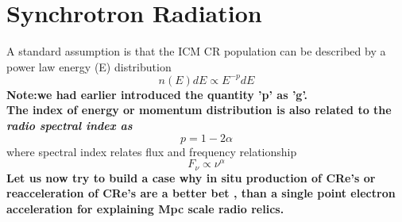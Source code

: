 \documentclass[11pt]{report}
\newcommand{\tbf}[1]{\textbf{#1}}
\newcommand{\tit}[1]{\textit{#1}}
\begin{document}
\section{Synchrotron Radiation}
 A standard assumption is that the ICM CR population can be described by a power law energy (E) distribution 
 \begin{equation}
 n(E)dE\propto E^{-p}dE
 \end{equation}
 \textbf{Note:we had earlier introduced the quantity 'p' as 'g'.}\\
 \textbf{The index of energy or momentum distribution is also related to the \tit{radio spectral index as}}
 \begin{equation}
 p=1-2\alpha
 \end{equation}
 where spectral index relates flux and frequency relationship
 \begin{equation}
 F_\nu \propto \nu^\alpha
 \end{equation}
 \tbf{Let us now try to build a case why in situ production of CRe's or reacceleration of CRe's are a better bet , than a single point electron acceleration for explaining Mpc scale radio relics.}\\
\end{document}
